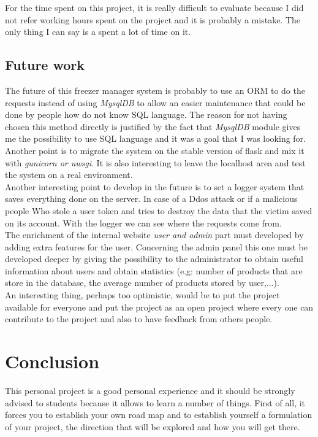 For the time spent on this project, it is really difficult to evaluate because I did not refer working hours spent on the project and it is probably a mistake. The only thing I can say is a spent a lot of time on it.
\subsection{Future work}
The future of this freezer manager system is probably to use an ORM to do the requests instead of using \textit{MysqlDB} to allow an easier maintenance that could be done by people how do not know SQL language. The reason for not having chosen this method directly is justified by the fact that \textit{MysqlDB} module gives me the possibility to use SQL language and it was a goal that I was looking for.\\

Another point is to migrate the system on the stable version of flask and mix it with \textit{gunicorn or uwsgi}. It is also interesting to leave the localhost area and test the system on a real environment.\\

Another interesting point to develop in the future is to set a logger system that saves everything done on the server. In case of a Ddos attack or if a malicious people Who stole a user token and tries to destroy the data that the victim saved on its account. With the logger we can see where the requests come from.\\

The enrichment of the internal website \textit{user and admin} part must developed by adding extra features for the user. Concerning the admin panel this one must be developed deeper by giving the possibility to the administrator to obtain useful information about users and obtain statistics (e.g: number of products that are store in the database, the average number of products stored by user,...).\\

An interesting thing, perhaps too optimistic, would be to put the project available for everyone and put the project as an open project where every one can contribute to the project and also to have feedback from others people.

\section{Conclusion}
This personal project is a good personal experience and it should be strongly advised to students because it allows to learn a number of things. First of all, it forces you to establish your own road map and to establish yourself a formulation of your project, the direction that will be explored and how you will get there.\\

